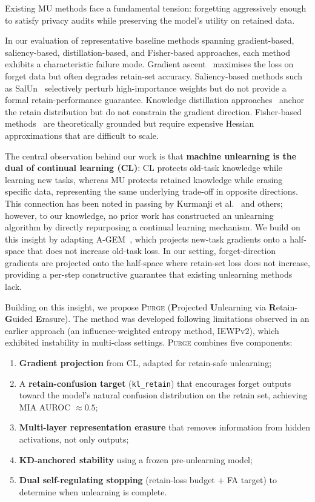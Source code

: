 \documentclass[10pt,twocolumn]{article}
\newcommand{\ours}{\textsc{Purge}}
\newcommand{\klr}{\texttt{kl\_retain}}
\begin{document}
Existing MU methods face a fundamental tension: forgetting aggressively enough to satisfy privacy audits while preserving the model's utility on retained data.

In our evaluation of representative baseline methods spanning gradient-based, saliency-based, distillation-based, and Fisher-based approaches, each method exhibits a characteristic failure mode.
Gradient ascent~\cite{thudi2022unrolling} maximises the loss on forget data but often degrades retain-set accuracy.
Saliency-based methods such as SalUn~\cite{fan2024salun} selectively perturb high-importance weights but do not provide a formal retain-performance guarantee.
Knowledge distillation approaches~\cite{chundawat2023badteacher} anchor the retain distribution but do not constrain the gradient direction.
Fisher-based methods~\cite{golatkar2021scrubbing} are theoretically grounded but require expensive Hessian approximations that are difficult to scale.



The central observation behind our work is that \textbf{machine unlearning is the dual of continual learning (CL)}: CL protects old-task knowledge while learning new tasks, whereas MU protects retained knowledge while erasing specific data, representing the same underlying trade-off in opposite directions.
This connection has been noted in passing by Kurmanji et al.~\cite{kurmanji2023unbounded} and others; however, to our knowledge, no prior work has constructed an unlearning algorithm by directly repurposing a continual learning mechanism.
We build on this insight by adapting A-GEM~\cite{chaudhry2019agem}, which projects new-task gradients onto a half-space that does not increase old-task loss.
In our setting, forget-direction gradients are projected onto the half-space where retain-set loss does not increase, providing a per-step constructive guarantee that existing unlearning methods lack.


Building on this insight, we propose \ours{} (\textbf{P}rojected \textbf{U}nlearning via \textbf{R}etain-\textbf{G}uided \textbf{E}rasure).
The method was developed following limitations observed in an earlier approach (an influence-weighted entropy method, IEWPv2), which exhibited instability in multi-class settings.
\ours{} combines five components:
\begin{enumerate}[nosep,leftmargin=*]
  \item \textbf{Gradient projection} from CL, adapted for retain-safe unlearning;
  \item A \textbf{retain-confusion target} (\klr{}) that encourages forget outputs toward the model's natural confusion distribution on the retain set, achieving MIA AUROC $\approx 0.5$;
  \item \textbf{Multi-layer representation erasure} that removes information from hidden activations, not only outputs;
  \item \textbf{KD-anchored stability} using a frozen pre-unlearning model;
  \item \textbf{Dual self-regulating stopping} (retain-loss budget + FA target) to determine when unlearning is complete.
\end{enumerate}
\end{document}
